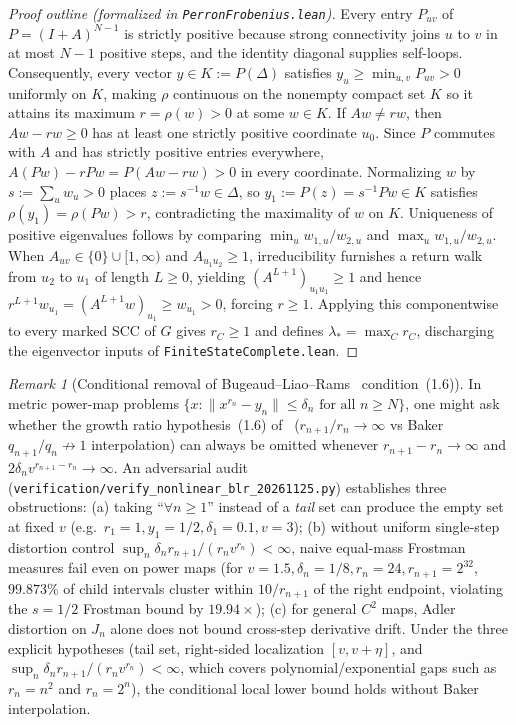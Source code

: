 \documentclass[11pt]{article}
\theoremstyle{definition}
\theoremstyle{remark}
\newtheorem{remark}[theorem]{Remark}
\begin{document}
\begin{proof}[Proof outline (formalized in \texttt{PerronFrobenius.lean})]
Every entry $P_{uv}$ of $P=(I+A)^{N-1}$ is strictly positive because strong
connectivity joins $u$ to $v$ in at most $N-1$ positive steps, and the identity
diagonal supplies self-loops. Consequently, every vector $y\in K:=P(\Delta)$
satisfies $y_u\ge\min_{u,v} P_{uv}>0$ uniformly on $K$, making $\rho$ continuous
on the nonempty compact set $K$ so it attains its maximum $r=\rho(w)>0$ at some
$w\in K$. If $Aw\neq rw$, then $Aw-rw\ge0$ has at least one strictly positive
coordinate $u_0$. Since $P$ commutes with $A$ and has strictly positive entries
everywhere, $A(Pw)-rPw=P(Aw-rw)>0$ in every coordinate. Normalizing $w$ by
$s:=\sum_u w_u>0$ places $z:=s^{-1}w\in\Delta$, so $y_1:=P(z)=s^{-1}Pw\in K$
satisfies $\rho(y_1)=\rho(Pw)>r$, contradicting the maximality of $w$ on $K$.
Uniqueness of positive eigenvalues follows by comparing $\min_u w_{1,u}/w_{2,u}$
and $\max_u w_{1,u}/w_{2,u}$. When $A_{uv}\in\{0\}\cup[1,\infty)$ and
$A_{u_1u_2}\ge1$, irreducibility furnishes a return walk from $u_2$ to $u_1$ of
length $L\ge0$, yielding $(A^{L+1})_{u_1u_1}\ge1$ and hence
$r^{L+1}w_{u_1}=(A^{L+1}w)_{u_1}\ge w_{u_1}>0$, forcing $r\ge1$. Applying this
componentwise to every marked SCC of $G$ gives $r_C\ge1$ and defines
$\lambda_*=\max_C r_C$, discharging the eigenvector inputs of
\texttt{FiniteStateComplete.lean}.
\end{proof}

\begin{remark}[Conditional removal of Bugeaud--Liao--Rams~\cite{BLR} condition~(1.6)]\label{rem:blr-audit}
In metric power-map problems $\{x:\|x^{r_n}-y_n\|\le\delta_n\text{ for all }n\ge N\}$,
one might ask whether the growth ratio hypothesis~(1.6) of~\cite{BLR} ($r_{n+1}/r_n\to\infty$
vs Baker~\cite{Baker2015} $q_{n+1}/q_n\not\to1$ interpolation) can always be
omitted whenever $r_{n+1}-r_n\to\infty$ and $2\delta_n v^{r_{n+1}-r_n}\to\infty$.
An adversarial audit (\texttt{verification/\allowbreak verify\_\allowbreak nonlinear\_\allowbreak blr\_\allowbreak 20261125.py})
establishes three obstructions: (a) taking ``$\forall n\ge 1$'' instead of a
\emph{tail} set can produce the empty set at fixed $v$ (e.g.\ $r_1=1,y_1=1/2,\delta_1=0.1,v=3$);
(b) without uniform single-step distortion control $\sup_n \delta_n r_{n+1}/(r_n v^{r_n})<\infty$,
naive equal-mass Frostman measures fail even on power maps (for $v=1.5,\delta_n=1/8,r_n=24,r_{n+1}=2^{32}$,
$99.873\%$ of child intervals cluster within $10/r_{n+1}$ of the right endpoint,
violating the $s=1/2$ Frostman bound by $19.94\times$); (c) for general $C^2$ maps,
Adler distortion on $J_n$ alone does not bound cross-step derivative drift.
Under the three explicit hypotheses (tail set, right-sided localization $[v,v+\eta]$,
and $\sup_n \delta_n r_{n+1}/(r_n v^{r_n})<\infty$, which covers polynomial/exponential
gaps such as $r_n=n^2$ and $r_n=2^n$), the conditional local lower bound holds
without Baker interpolation.
\end{remark}
\end{document}
